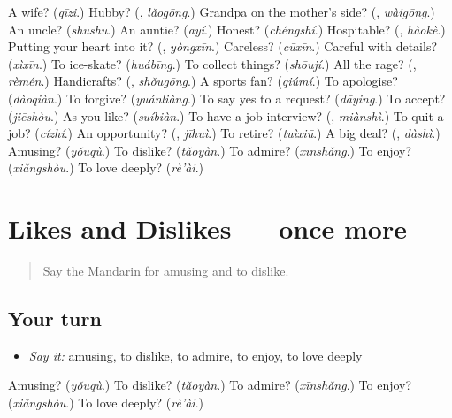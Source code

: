 \begin{tcolorbox}[breakable,colback=teal!4,colframe=teal!35!black,title={Before you move on}]
A wife? (\emph{qīzi}.) Hubby? (\textbf{}, \emph{lǎogōng}.) Grandpa on the mother's side? (\textbf{}, \emph{wàigōng}.) An uncle? (\emph{shūshu}.) An auntie? (\emph{āyí}.) Honest? (\emph{chéngshí}.) Hospitable? (\textbf{}, \emph{hàokè}.) Putting your heart into it? (\textbf{}, \emph{yòngxīn}.) Careless? (\emph{cūxīn}.) Careful with details? (\emph{xìxīn}.) To ice-skate? (\emph{huábīng}.) To collect things? (\emph{shōují}.) All the rage? (\textbf{}, \emph{rèmén}.) Handicrafts? (\textbf{}, \emph{shǒugōng}.) A sports fan? (\emph{qiúmí}.) To apologise? (\emph{dàoqiàn}.) To forgive? (\emph{yuánliàng}.) To say yes to a request? (\emph{dāying}.) To accept? (\emph{jiēshòu}.) As you like? (\emph{suíbiàn}.) To have a job interview? (\textbf{}, \emph{miànshì}.) To quit a job? (\emph{cízhí}.) An opportunity? (\textbf{}, \emph{jīhuì}.) To retire? (\emph{tuìxiū}.) A big deal? (\textbf{}, \emph{dàshì}.) Amusing? (\emph{yǒuqù}.) To dislike? (\emph{tǎoyàn}.) To admire? (\emph{xīnshǎng}.) To enjoy? (\emph{xiǎngshòu}.) To love deeply? (\emph{rè'ài}.)
\end{tcolorbox}
\section[(dialogue)]{Likes and Dislikes — once more}

\label{lesson:ZH-R277-review-final-277}



\begin{quote}
Say the Mandarin for amusing and to dislike.
\end{quote}

\subsection*{Your turn}
\begin{itemize}
\raggedright
  \item \emph{Say it:} amusing, to dislike, to admire, to enjoy, to love deeply
\end{itemize}

\begin{tcolorbox}[breakable,colback=teal!4,colframe=teal!35!black,title={Before you move on}]
Amusing? (\emph{yǒuqù}.) To dislike? (\emph{tǎoyàn}.) To admire? (\emph{xīnshǎng}.) To enjoy? (\emph{xiǎngshòu}.) To love deeply? (\emph{rè'ài}.)
\end{tcolorbox}
